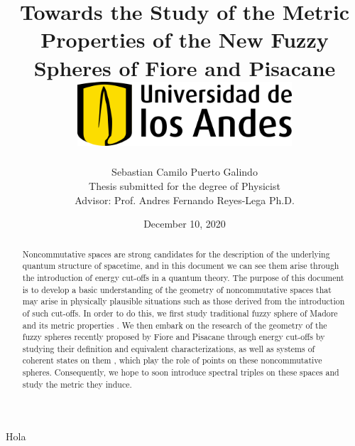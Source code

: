 \documentclass[12pt]{report}
\title 
{
	{Towards the Study of the Metric Properties of the New Fuzzy Spheres of Fiore and Pisacane}\\
	\vspace{1.5cm}
	{\includegraphics[width = 0.6\textwidth]{logo.png}}	
}
\author{Sebastian Camilo Puerto Galindo\\[1cm]{\small Thesis submitted for the degree of Physicist}\\ {\small  Advisor: Prof. Andres Fernando Reyes-Lega Ph.D.}}
\date{December 10, 2020}
\newenvironment{dedication}
  {\clearpage           %
   \thispagestyle{empty}%
   \vspace*{\stretch{1}}%
   \raggedleft          %
  }
  {\par %
   \vspace{\stretch{3}} %
   \clearpage           %
  }
\theoremstyle{definition}
\begin{document}

\maketitle

\begin{dedication}
{\LARGE\calligra Hola}
\end{dedication}

\begin{abstract}
Noncommutative spaces are strong candidates for the description of the underlying quantum structure of spacetime, and in this document we can see them arise through the introduction of energy cut-offs in a quantum theory. The purpose of this document is to develop a basic understanding of the geometry of noncommutative spaces that may arise in physically plausible situations such as those derived from the introduction of such cut-offs. In order to do this, we first study traditional fuzzy sphere of Madore \cite{Madore} and its metric properties \cite{DAndrea2013}. We then embark on the research of the geometry of the fuzzy spheres recently proposed by Fiore and Pisacane \cite{Fiore2018} through energy cut-offs by studying their definition and equivalent characterizations, as well as systems of coherent states on them \cite{FioreCoherent2020, FioreXi2020}, which play the role of points on these noncommutative spheres. Consequently, we hope to soon introduce spectral triples on these spaces and study the metric they induce. %
\end{abstract}
\end{document}
